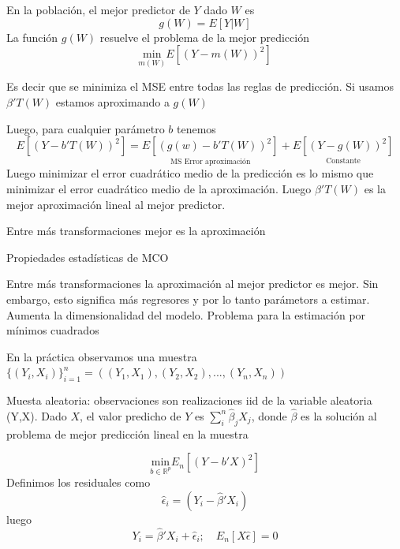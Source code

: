 \documentclass[aspectratio=169,xcolor=dvipsnames]{beamer}
\begin{document}
\begin{frame}
    En la población, el mejor predictor de $Y$ dado $W$ es
    \begin{equation*}
        g(W)=E[Y|W]
    \end{equation*}
    La función $g(W)$ resuelve el problema de la mejor predicción
\begin{equation*}
            \underset{m(W)}{\mathrm{min}}E[(Y-m(W))^2]
        \end{equation*}

        Es decir que se minimiza el MSE entre todas las reglas de predicción. Si usamos $\beta'T(W)$ estamos aproximando a $g(W)$
    
\end{frame}
\begin{frame}
    Luego, para cualquier parámetro $b$ tenemos
    \begin{equation*}
        E[(Y-b'T(W))^2]=\underset{\text{MS Error aproximación}}{E[(g(w)-b'T(W))^2]}+\underset{\text{Constante}}{E[(Y-g(W))^2]}
    \end{equation*}
    Luego minimizar el error cuadrático medio de la predicción es lo mismo que minimizar el error cuadrático medio de la aproximación. Luego $\beta'T(W)$ es la mejor aproximación lineal al mejor predictor.

    Entre más transformaciones mejor es la aproximación
\end{frame}

\begin{frame}{Propiedades estadísticas de MCO}

Entre más transformaciones la aproximación al mejor predictor es mejor. Sin embargo, esto significa más regresores y por lo tanto parámetors a estimar. Aumenta la dimensionalidad del modelo. Problema para la estimación por mínimos cuadrados
    
\end{frame}

\begin{frame}
En la práctica observamos una muestra $\{(Y_i,X_i)\}_{i=1}^n=((Y_1,X_1),(Y_2,X_2),...,(Y_n,X_n))$

Muesta aleatoria: observaciones son realizaciones iid de la variable aleatoria (Y,X). Dado $X$, el valor predicho de $Y$ es $\sum_i^n\hat{\beta}_jX_j$, donde $\hat{\beta}$ es la solución al problema de mejor predicción lineal en la muestra

\begin{equation*}
 \underset{b\in \mathbb{R}^p}{\mathrm{min}}E_n[(Y-b'X)^2]    
\end{equation*}
Definimos los residuales como
\begin{equation*}
    \hat{\epsilon}_i=(Y_i-\hat{\beta}'X_i)
\end{equation*}
luego
\begin{equation*}
    Y_i=\hat{\beta}'X_i+\hat{\epsilon}_i; \quad E_n[X\hat{\epsilon}]=0
\end{equation*}
\end{frame}
\end{document}
